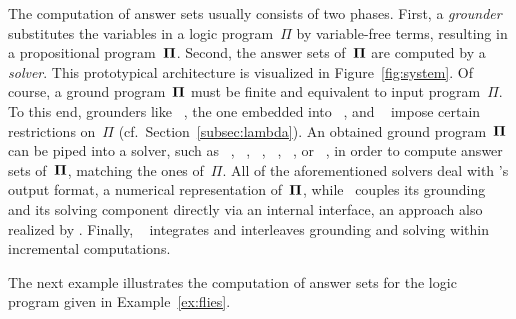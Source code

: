 
The computation of answer sets usually consists of two phases.
First, a \emph{grounder} substitutes the variables in a logic program~$\Pi$
by variable-free terms, resulting in a propositional program~$\mathbf{\Pi}$.
Second, the answer sets of~$\mathbf{\Pi}$ are computed by a \emph{solver}.
This prototypical architecture is visualized in Figure~\ref{fig:system}.
Of course, a ground program~$\mathbf{\Pi}$ must be finite and equivalent to
input program~$\Pi$.
To this end, grounders like \lparse~\cite{lparseManual},
the one embedded into \dlv~\cite{dlv03a},
and \gringo\footnotemark~\cite{gescth07a}
impose certain restrictions on~$\Pi$ (cf.\ Section~\ref{subsec:lambda}).
An obtained ground program~$\mathbf{\Pi}$ can be piped into a solver, such as 
\assat~\cite{linzha04a}, 
\clasp\footnotemark[\value{footnote}]~\cite{gekanesc07b},
\cmodels~\cite{gilima06a},
\nomorepp~\cite{angelinesc05c},
\smodels~\cite{siniso02a}, or
\smodelscc~\cite{warsch04a},
in order to compute answer sets of~$\mathbf{\Pi}$, matching the ones of~$\Pi$.
All of the aforementioned solvers deal with \lparse's output format,
a numerical representation of~$\mathbf{\Pi}$,
while \dlv\ couples its grounding and its solving component directly
via an internal interface,
an approach also realized by \clingo\footnotemark[\value{footnote}].
Finally, \iclingo\footnotemark[\value{footnote}]~\cite{gekakaosscth08a} integrates and interleaves
grounding and solving within incremental computations.
%

The next example illustrates the computation of answer sets for
the logic program given in Example~\ref{ex:flies}.

